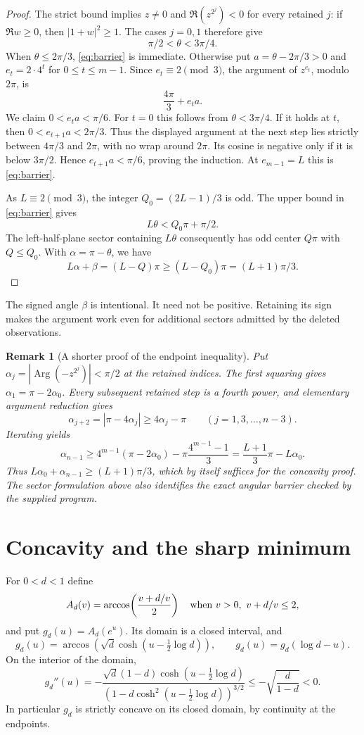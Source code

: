 \documentclass[11pt]{article}
\newtheorem{remark}[theorem]{Remark}
\newcommand{\Arg}{\operatorname{Arg}}
\begin{document}
\begin{proof}
The strict bound implies $z\ne0$ and $\Re(z^{2^j})<0$ for every retained $j$: if $\Re w\ge0$, then $|1+w|^2\ge1$. The cases $j=0,1$ therefore give
\[
 \pi/2<\theta<3\pi/4.
\]
When $\theta\le2\pi/3$, \eqref{eq:barrier} is immediate. Otherwise put $a=\theta-2\pi/3>0$ and $e_t=2\cdot4^t$ for $0\le t\le m-1$. Since $e_t\equiv2\pmod3$, the argument of $z^{e_t}$, modulo $2\pi$, is
\[
 \frac{4\pi}{3}+e_ta.
\]
We claim $0<e_ta<\pi/6$. For $t=0$ this follows from $\theta<3\pi/4$. If it holds at $t$, then $0<e_{t+1}a<2\pi/3$. Thus the displayed argument at the next step lies strictly between $4\pi/3$ and $2\pi$, with no wrap around $2\pi$. Its cosine is negative only if it is below $3\pi/2$. Hence $e_{t+1}a<\pi/6$, proving the induction. At $e_{m-1}=L$ this is \eqref{eq:barrier}.

As $L\equiv2\pmod3$, the integer $Q_0=(2L-1)/3$ is odd. The upper bound in \eqref{eq:barrier} gives
\[
 L\theta<Q_0\pi+\pi/2.
\]
The left-half-plane sector containing $L\theta$ consequently has odd center $Q\pi$ with $Q\le Q_0$. With $\alpha=\pi-\theta$, we have
\[
 L\alpha+\beta=(L-Q)\pi\ge(L-Q_0)\pi=(L+1)\pi/3.
\]
\end{proof}

The signed angle $\beta$ is intentional. It need not be positive. Retaining its sign makes the argument work even for additional sectors admitted by the deleted observations.

\begin{remark}[A shorter proof of the endpoint inequality]
Put $\alpha_j=|\Arg(-z^{2^j})|<\pi/2$ at the retained indices. The first squaring gives $\alpha_1=\pi-2\alpha_0$. Every subsequent retained step is a fourth power, and elementary argument reduction gives
\[
 \alpha_{j+2}=|\pi-4\alpha_j|\ge4\alpha_j-\pi
 \qquad(j=1,3,\ldots,n-3).
\]
Iterating yields
\[
 \alpha_{n-1}\ge4^{m-1}(\pi-2\alpha_0)
 -\pi\frac{4^{m-1}-1}{3}
 =\frac{L+1}{3}\pi-L\alpha_0.
\]
Thus $L\alpha_0+\alpha_{n-1}\ge(L+1)\pi/3$, which by itself suffices for the concavity proof. The sector formulation above also identifies the exact angular barrier checked by the supplied program.
\end{remark}


\section{Concavity and the sharp minimum}

For $0<d<1$ define
\[
 A_d(v)=\arccos\!\left(\frac{v+d/v}{2}\right)
 \quad\hbox{when }v>0,\ v+d/v\le2,
\]
and put $g_d(u)=A_d(e^u)$. Its domain is a closed interval, and
\begin{equation}\label{eq:g}
 g_d(u)=\arccos\!\left(\sqrt d\cosh\!\left(u-\tfrac12\log d\right)\right),
 \qquad g_d(u)=g_d(\log d-u).
\end{equation}
On the interior of the domain,
\begin{equation}\label{eq:curvature}
 g_d''(u)=
 -\frac{\sqrt d(1-d)\cosh(u-\tfrac12\log d)}
 {\left(1-d\cosh^2(u-\tfrac12\log d)\right)^{3/2}}
 \le-\sqrt{\frac{d}{1-d}}<0.
\end{equation}
In particular $g_d$ is strictly concave on its closed domain, by continuity at the endpoints.
\end{document}
